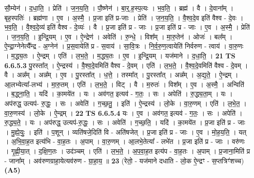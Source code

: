 \documentclass[17pt]{extarticle}
\begin{document}
                  सौ॒म्येन॑ । द॒धा॒ति॒ । प्रेति॑ । ज॒न॒य॒ति॒ । पौ॒ष्णेन॑ । बा॒र्॒.ह॒स्प॒त्यः । भ॒व॒ति॒ । ब्रह्म॑ । वै । दे॒वाना᳚म् । बृह॒स्पतिः॑ । ब्रह्म॑णा । ए॒व । अ॒स्मै॒ । प्र॒जा इति॑ प्र-जाः । प्रेति॑ । ज॒न॒य॒ति॒ । वै॒श्व॒दे॒व इति॑ वैश्व - दे॒वः । भ॒व॒ति॒ । वै॒श्व॒दे॒व्य॑ इति॑ वैश्व - दे॒व्यः॑ । वै । प्र॒जा इति॑ प्र - जाः । प्र॒जा इति॑ प्र - जाः । ए॒व । अ॒स्मै॒ । प्रेति॑ । ज॒न॒य॒ति॒ । इ॒न्द्रि॒यम् । ए॒व । ऐ॒न्द्रेण॑ । अवेति॑ । रु॒न्धे॒ । विश᳚म् । मा॒रु॒तेन॑ । ओजः॑ । बल᳚म् । ऐ॒न्द्रा॒ग्नेनेत्यै᳚न्द्र - अ॒ग्नेन॑ । प्र॒स॒वायेति॑ प्र - स॒वाय॑ । सा॒वि॒त्रः । नि॒र्व॒रु॒ण॒त्वायेति॑ निर्वरुण - त्वाय॑ । वा॒रु॒णः । म॒द्ध्य॒तः । ऐ॒न्द्रम् । एति॑ । ल॒भ॒ते॒ । म॒द्ध्य॒तः । ए॒व । इ॒न्द्रि॒यम् । यज॑माने । द॒धा॒ति॒ । \textbf{  21} \newline
                  \newline
                                \textbf{ TS 6.6.5.3} \newline
                  पु॒रस्ता᳚त् । ऐ॒न्द्रस्य॑ । वै॒श्व॒दे॒वमिति॑ वैश्व - दे॒वम् । एति॑ । ल॒भ॒ते॒ । वै॒श्व॒दे॒वमिति॑ वैश्व - दे॒वम् । वै । अन्न᳚म् । अन्न᳚म् । ए॒व । पु॒रस्ता᳚त् । ध॒त्ते॒ । तस्मा᳚त् । पु॒रस्ता᳚त् । अन्न᳚म् । अ॒द्य॒ते॒ । ऐ॒न्द्रम् । आ॒लभ्येत्या᳚-लभ्य॑ । मा॒रु॒तम् । एति॑ । ल॒भ॒ते॒ । विट् । वै । म॒रुतः॑ । विश᳚म् । ए॒व । अ॒स्मै॒ । अन्विति॑ । ब॒द्ध्ना॒ति॒ । यदि॑ । का॒मये॑त । यः । अव॑गत॒ इत्यव॑ - ग॒तः॒ । सः । अपेति॑ । रु॒द्ध्य॒ता॒म् । यः । अप॑रुद्ध॒ उत्यप॑- रु॒द्धः॒ । सः । अवेति॑ । ग॒च्छ॒तु॒ । इति॑ । ऐ॒न्द्रस्य॑ । लो॒के । वा॒रु॒णम् । एति॑ । ल॒भे॒त॒ । वा॒रु॒णस्य॑ । लो॒के । ऐ॒न्द्रम् । \textbf{  22} \newline
                  \newline
                                \textbf{ TS 6.6.5.4} \newline
                  यः । ए॒व । अव॑गत॒ इत्यव॑ - ग॒तः॒ । सः । अपेति॑ । रु॒द्ध्य॒ते॒ । यः । अप॑रुद्ध॒ उत्यप॑-रु॒द्धः॒ । सः । अवेति॑ । ग॒च्छ॒ति॒ । यदि॑ । का॒मये॑त । प्र॒जा इति॑ प्र - जाः । मु॒ह्ये॒युः॒ । इति॑ । प॒शून् । व्यति॑षजे॒दिति॑ वि - अति॑षजेत् । प्र॒जा इति॑ प्र - जाः । ए॒व । मो॒ह॒य॒ति॒ । यत् । अ॒भि॒वा॒ह॒त इत्य॑भि - वा॒ह॒तः । अ॒पाम् । वा॒रु॒णम् । आ॒लभे॒तेत्या᳚ - लभे॑त । प्र॒जा इति॑ प्र - जाः । वरु॑णः । गृ॒ह्णी॒या॒त् । द॒क्षि॒ण॒तः । उद॑ञ्चम् । एति॑ । ल॒भ॒ते॒ । अ॒प॒वा॒ह॒त इत्य॑प - वा॒ह॒तः । अ॒पाम् । प्र॒जाना॒मिति॑ प्र - जाना᳚म् । अव॑रुणग्राहा॒येत्यव॑रुण - ग्रा॒हा॒य॒ ॥ \textbf{  23 } \newline
                  \newline
                      (रेतो॒ - यज॑माने दधाति - लो॒क ऐ॒न्द्रꣳ - स॒प्तत्रिꣳ॑शच्च)  \textbf{(A5)} \newline \newline
\end{document}
